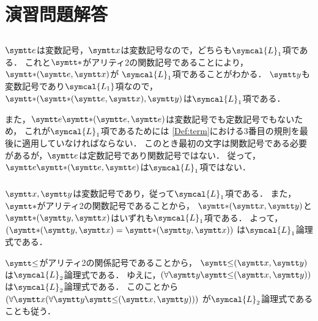 \chapter{演習問題解答} \label{chap:answer}

\section*{}

\subsection*{} \label{answer:termexample}

\(\obj{e}\)は変数記号，\(\obj{x}\)は変数記号なので，どちらも\(\symcal{L}_1\)項である．
これと\(\obj{\ast}\)がアリティ2の関数記号であることにより，\(\apply{\obj{\ast}}{\obj{e}, \obj{x}}\)が
\(\symcal{L}_1\)項であることがわかる．
\(\obj{y}\)も変数記号であり\(\symcal{L_1}\)項なので，
\(\apply{\obj{\ast}}{\apply{\obj{\ast}}{\obj{e}, \obj{x}}, \obj{y}}\)は\(\symcal{L}_1\)項である．

また，\(\obj{e}\apply{\mathord{\obj{\ast}}}{\obj{e}, \obj{e}}\)は変数記号でも定数記号でもないため，
これが\(\symcal{L}_1\)項であるためには
\cref{Def:term}における3番目の規則を最後に適用していなければならない．
このとき最初の文字は関数記号である必要があるが，\(\obj{e}\)は定数記号であり関数記号ではない．
従って，\(\obj{e}\apply{\mathord{\obj{\ast}}}{\obj{e}, \obj{e}}\)は\(\symcal{L}_1\)項ではない．

\subsection*{}

\(\obj{x}, \obj{y}\)は変数記号であり，従って\(\symcal{L}_1\)項である．
また，\(\obj{\ast}\)がアリティ2の関数記号であることから，
\(\apply{\mathord{\obj{\ast}}}{\obj{x}, \obj{y}}\)と
\(\apply{\mathord{\obj{\ast}}}{\obj{y}, \obj{x}}\)はいずれも\(\symcal{L}_1\)項である．
よって，
\(\paren{\apply{\mathord{\obj{\ast}}}{\obj{y}, \obj{x}} = \apply{\mathord{\obj{\ast}}}{\obj{y}, \obj{x}}}\)
は\(\symcal{L}_1\)論理式である．

\(\obj{\leq}\)がアリティ2の関係記号であることから，
\(\apply{\mathord{\obj{\leq}}}{\obj{x}, \obj{y}}\)は\(\symcal{L}_2\)論理式である．
ゆえに，\(\paren{\forall \obj{y}\apply{\mathord{\obj{\leq}}}{\obj{x}, \obj{y}}}\)
は\(\symcal{L}_2\)論理式である．
このことから\(\paren{\forall \obj{x}\paren{\forall \obj{y}\apply{\mathord{\obj{\leq}}}{\obj{x}, \obj{y}}}}\)
が\(\symcal{L}_2\)論理式であることも従う．

